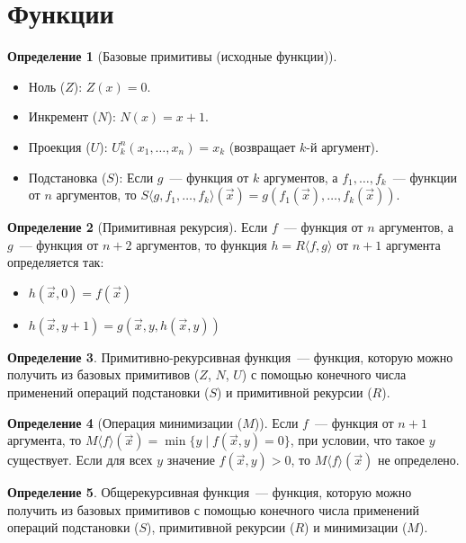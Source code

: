 \documentclass[a4paper,11pt]{article}
\theoremstyle{definition}
\newtheorem*{dfn}{Определение}
\newcommand{\Sh}[1]{S\langle #1\rangle}
\newcommand{\Rr}[1]{R\langle #1\rangle}
\newcommand{\Mn}[1]{M\langle #1\rangle}
\begin{document}
\section{Функции}
\begin{dfn}[Базовые примитивы (исходные функции)]
\begin{itemize}
\item Ноль ($Z$): $Z(x) = 0$.
\item Инкремент ($N$): $N(x) = x + 1$.
\item Проекция ($U$): $U^n_k(x_1, \dots, x_n) = x_k$ (возвращает $k$-й аргумент).
\item Подстановка ($S$): Если $g$~--- функция от $k$ аргументов, а $f_1, \dots,
  f_k$~--- функции от $n$ аргументов, то $\Sh{g, f_1, \dots, f_k}(\vec x) =
  g(f_1(\vec x), \dots, f_k(\vec x))$.
\end{itemize}
\end{dfn}
\begin{dfn}[Примитивная рекурсия]
Если $f$~--- функция от $n$ аргументов, а $g$~--- функция от $n+2$ аргументов, то
функция $h = \Rr{f, g}$ от $n+1$ аргумента определяется так:
\begin{itemize}
\item $h(\vec x, 0) = f(\vec x)$
\item $h(\vec x, y+1) = g(\vec x, y, h(\vec x, y))$
\end{itemize}
\end{dfn}
\begin{dfn}
Примитивно-рекурсивная функция~--- функция, которую можно получить из базовых
примитивов ($Z$, $N$, $U$) с помощью конечного числа применений операций
подстановки ($S$) и примитивной рекурсии ($R$).
\end{dfn}
\begin{dfn}[Операция минимизации ($M$)]
Если $f$~--- функция от $n+1$ аргумента, то $\Mn{f}(\vec x) = \min\{y \mid
f(\vec x, y) = 0\}$, при условии, что такое $y$ существует. Если для всех $y$
значение $f(\vec x, y) > 0$, то $\Mn{f}(\vec x)$ не определено.
\end{dfn}
\begin{dfn}
Общерекурсивная функция~--- функция, которую можно получить из базовых
примитивов с помощью конечного числа применений операций подстановки ($S$),
примитивной рекурсии ($R$) и минимизации ($M$).
\end{dfn}
\end{document}
